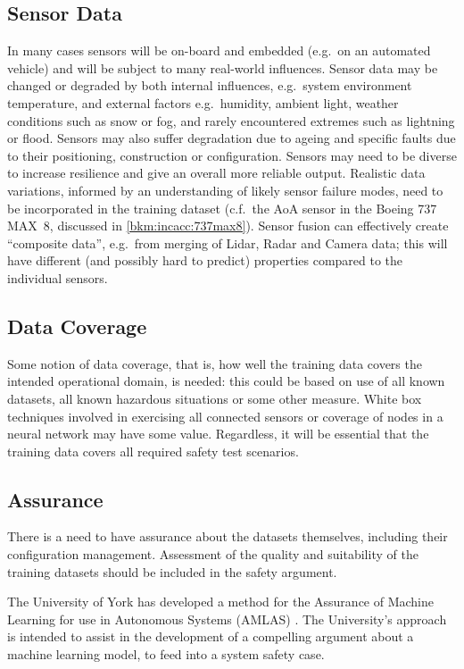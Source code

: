 \subsection{Sensor Data}
In many cases sensors will be on-board and embedded (e.g.\ on an automated vehicle) and will be subject to many real-world influences. Sensor data may be changed or degraded by both internal influences, e.g.\ system environment temperature, and external factors e.g.\ humidity, ambient light, weather conditions such as snow or fog, and rarely encountered extremes such as lightning or flood. 
Sensors may also suffer degradation due to ageing and specific faults due to their positioning, construction or configuration. Sensors may need to be diverse to increase resilience and give an overall more reliable output. Realistic data variations, informed by an understanding of likely sensor failure modes, need to be incorporated in the training \gls{dataset} (c.f.\ the AoA sensor in the Boeing 737 MAX~8, discussed in \autoref{bkm:incacc:737max8}).
Sensor fusion can effectively create ``composite data'', e.g.\ from merging of Lidar, Radar and Camera data; this will have different (and possibly hard to predict) properties compared to the individual sensors.

\subsection{Data Coverage}
Some notion of data coverage, that is, how well the training data covers the intended operational domain, is needed: this could be based on use of all known \glspl{dataset}, all known hazardous situations or some other measure. White box techniques involved in exercising all connected sensors or coverage of nodes in a neural network may have some value. Regardless, it will be essential that the training data covers all required safety test scenarios.

\subsection{ Assurance}
There is a need to have assurance about the \glspl{dataset} themselves, including their configuration management. Assessment of the quality and suitability of the training \glspl{dataset} should be included in the safety argument.

The University of York has developed a method for the Assurance of Machine Learning for use in Autonomous Systems (AMLAS)
\cite{citation:machinelearning:amlas}.
The University's approach is intended to assist in the development of a compelling argument about a machine learning model,
to feed into a system safety case.

